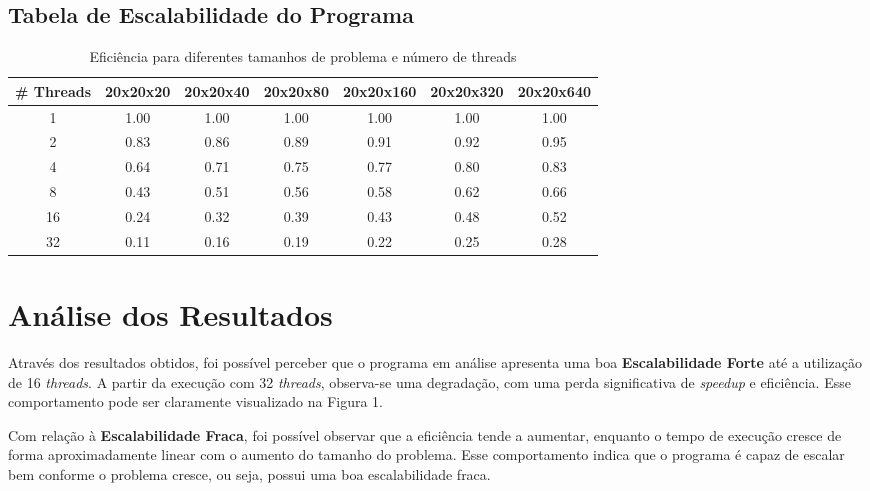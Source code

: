 \documentclass[a4paper, 12pt]{article}
\begin{document}
	 \subsection{Tabela de Escalabilidade do Programa}
	 \begin{table}[H]
	 	\centering
	 	\begin{tabular}{|c|c|c|c|c|c|c|}
	 		\hline
	 		\textbf{\# Threads} & \textbf{20x20x20} & \textbf{20x20x40} & \textbf{20x20x80} & \textbf{20x20x160} & \textbf{20x20x320} & \textbf{20x20x640} \\ \hline
	 		1 & \cellcolor{yellow!20} 1.00 & 1.00 & 1.00 & 1.00 & 1.00 & 1.00 \\ \hline
	 		2 & 0.83 & \cellcolor{yellow!20}0.86 & 0.89 & 0.91 & 0.92 & 0.95 \\ \hline
	 		4 & 0.64 & 0.71 & \cellcolor{yellow!20} 0.75 & 0.77 & 0.80 & 0.83 \\ \hline
	 		8 & 0.43 & 0.51 & 0.56 & \cellcolor{yellow!20} 0.58 & 0.62 & 0.66 \\ \hline
	 		16 & 0.24 & 0.32 & 0.39 & 0.43 & \cellcolor{yellow!20} 0.48 & 0.52 \\ \hline
	 		32 & 0.11 & 0.16 & 0.19 & 0.22 & 0.25 & \cellcolor{yellow!20} 0.28 \\ \hline
	 	\end{tabular}
	 	\caption{Eficiência para diferentes tamanhos de problema e número de threads}
	 \end{table}
	 
	 \section{Análise dos Resultados}
	 
	 \hspace{0.68cm}Através dos resultados obtidos, foi possível perceber que o programa em análise apresenta uma boa \textbf{Escalabilidade Forte} até a utilização de 16 \textit{threads}. A partir da execução com 32 \textit{threads}, observa-se uma degradação, com uma perda significativa de \textit{speedup} e eficiência. Esse comportamento pode ser claramente visualizado na Figura 1.
	 
	 \hspace{0.68cm}Com relação à \textbf{Escalabilidade Fraca}, foi possível observar que a eficiência tende a aumentar, enquanto o tempo de execução cresce de forma aproximadamente linear com o aumento do tamanho do problema. Esse comportamento indica que o programa é capaz de escalar bem conforme o problema cresce, ou seja, possui uma boa escalabilidade fraca.
	 
\end{document}
